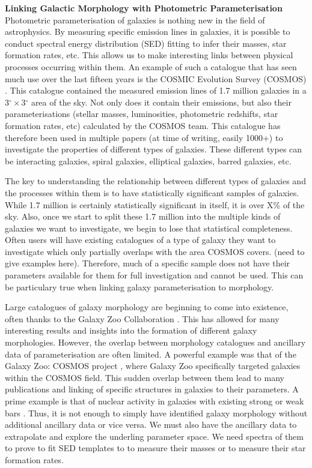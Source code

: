 \documentclass[11pt,usenatbib]{article}
\begin{document}
\vspace{-5mm}
\justification
\vspace{-3mm}
\noindent\textbf{Linking Galactic Morphology with Photometric Parameterisation} \\
Photometric parameterisation of galaxies is nothing new in the field of astrophysics. By measuring specific emission lines in galaxies, it is possible to conduct spectral energy distribution (SED) fitting to infer their masses, star formation rates, etc. This allows us to make interesting links between physical processes occurring within them. An example of such a catalogue that has seen much use over the last fifteen years is the COSMIC Evolution Survey (COSMOS) \citep{cosmos catalogue}. This catalogue contained the measured emission lines of 1.7 million galaxies in a 3$^{\circ} \times $3$^{\circ}$ area of the sky. Not only does it contain their emissions, but also their parameterisations (stellar masses, luminosities, photometric redshifts, star formation rates, etc) calculated by the COSMOS team. This catalogue has therefore been used in multiple papers (at time of writing, easily 1000+) to investigate the properties of different types of galaxies. These different types can be interacting galaxies, spiral galaxies, elliptical galaxies, barred galaxies, etc.

The key to understanding the relationship between different types of galaxies and the processes within them is to have statistically significant samples of galaxies. While 1.7 million is certainly statistically significant in itself, it is over X\% of the sky. Also, once we start to split these 1.7 million into the multiple kinds of galaxies we want to investigate, we begin to lose that statistical completeness. Often users will have existing catalogues of a type of galaxy they want to investigate which only partially overlaps with the area COSMOS covers. (need to give examples here). Therefore, much of a specific sample does not have their parameters available for them for full investigation and cannot be used. This can be particulary true when linking galaxy parameterisation to morphology.

Large catalogues of galaxy morphology are beginning to come into existence, often thanks to the Galaxy Zoo Collaboration \citep{lintott_08}. This has allowed for many interesting results and insights into the formation of different galaxy morphologies. However, the overlap between morphology catalogues and ancillary data of parameterisation are often limited. A powerful example was that of the Galaxy Zoo: COSMOS project \citep{}, where Galaxy Zoo specifically targeted galaxies within the COSMOS field. This sudden overlap between them lead to many publications and linking of specific structures in galaxies to their parameters. A prime example is that of nuclear activity in galaxies with existing strong or weak bars \citep{papers using cosmos with galaxy zoo}. Thus, it is not enough to simply have identified galaxy morphology without additional ancillary data or vice versa. We must also have the ancillary data to extrapolate and explore the underling parameter space. We need spectra of them to prove to fit SED templates to to measure their masses or to measure their star formation rates. 
\end{document}

